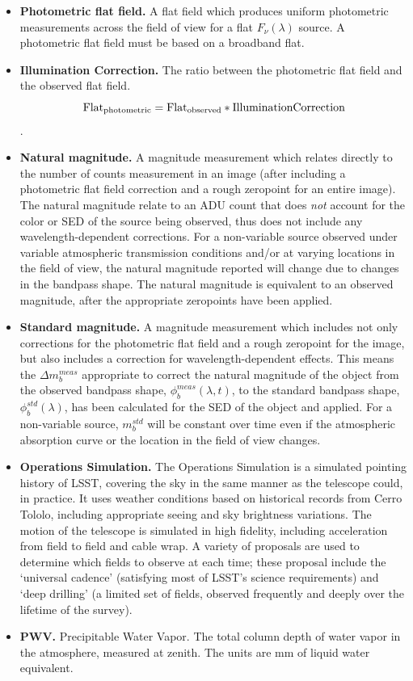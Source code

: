 \documentclass[12pt,preprint]{aastex}
\begin{document}
\begin{itemize}
\item{{\bf Photometric flat field.} A flat field which produces
    uniform photometric measurements across the field of view for a
    flat $F_\nu(\lambda)$ source. A photometric flat field must be
    based on a broadband flat.}

\item{{\bf Illumination Correction.} The ratio between the
    photometric flat field  and the observed flat field. 
\begin{equation}
\rm{Flat}_{photometric} = \rm{Flat}_{observed} * \rm{Illumination
 Correction}
\end{equation}. 
}

\item{{\bf Natural magnitude.} A magnitude measurement which relates
    directly to the number of counts measurement in an image (after
    including a photometric flat field correction and a rough
    zeropoint for an entire image). The natural magnitude relate to
    an ADU count that does {\it not} account for the color or SED of
    the source being observed, thus does not include any
    wavelength-dependent corrections. For a non-variable source
    observed under variable atmospheric transmission conditions and/or at
    varying locations in the field of view, the natural magnitude
    reported will change due to changes in the bandpass shape. The
    natural magnitude is equivalent to an observed
    magnitude, after the appropriate zeropoints have been applied.} 

\item{{\bf Standard magnitude.} A magnitude measurement which includes
  not only corrections for the photometric flat field and a rough
  zeropoint for the image, but also includes a correction for
  wavelength-dependent effects. This means the $\Delta m_b^{meas}$
  appropriate to correct the natural magnitude of the object from the
  observed bandpass shape,  $\phi_b^{meas}(\lambda,t)$, to the
  standard bandpass shape, $\phi_b^{std}(\lambda)$, has been
  calculated for the SED of the object and applied.  For a
  non-variable source, $m_b^{std}$ will be constant over time even if
  the atmospheric absorption curve or the location in the field of
  view changes.}

\item{{\bf Operations Simulation.} The Operations Simulation is a
simulated pointing history of LSST, covering the sky in the same
manner as the telescope could, in practice. It uses weather conditions
based on historical records from Cerro Tololo, including appropriate
seeing and sky brightness variations. The motion of the telescope is
simulated in high fidelity, including acceleration from field to field
and cable wrap.  A variety of proposals are used to determine which
fields to observe at each time; these proposal include the `universal
cadence' (satisfying most of LSST's science requirements) and `deep
drilling' (a limited set of fields, observed frequently and deeply
over the lifetime of the survey). }

\item{{\bf PWV.} Precipitable Water Vapor.  The total column depth of water vapor in the atmosphere, measured 
at zenith.  The units are mm of liquid water equivalent. }

\end{itemize}
\end{document}
